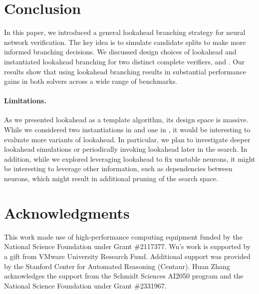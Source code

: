 \documentclass{article}
\begin{document}
\section{Conclusion}\label{sec:conclusion}
In this paper, we introduced a general lookahead branching strategy for neural network verification. The key idea is to simulate candidate splits to make more informed branching decisions. We discussed design choices of lookahead and instantiated lookahead branching for two distinct complete verifiers, \marabou and \abcrown. Our results show that using lookahead branching results in substantial performance gains in both solvers across a wide range of benchmarks. 

\paragraph{Limitations.} As we presented lookahead as a template algorithm, its design space is massive. While we considered two instantiations in \marabou and one in \abcrown, it would be interesting to evaluate more variants of lookahead. In particular, we plan to investigate deeper lookahead simulations or periodically invoking lookahead later in the search. In addition, while we explored leveraging lookahead to fix unstable neurons, it might be interesting to leverage other information, such as dependencies between neurons, which might result in additional pruning of the search space.


\newpage
\section*{Acknowledgments}

This work made use of high-performance computing equipment funded by the National Science Foundation under Grant \#2117377. Wu's work is supported by a gift from VMware University Research Fund. Additional support was provided by the Stanford Center for Automated Reasoning (Centaur). Huan Zhang acknowledges the support from the Schmidt Sciences AI2050 program and the National Science Foundation under Grant \#2331967.



\end{document}
